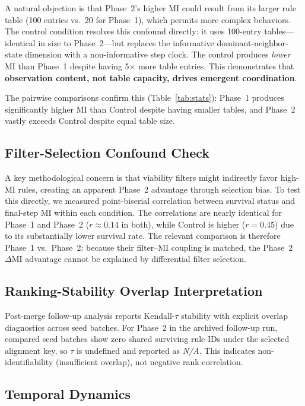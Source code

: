 \documentclass[letterpaper]{article}
\begin{document}
A natural objection is that Phase~2's higher MI could result from its larger
rule table (100 entries vs.\ 20 for Phase~1), which permits more complex
behaviors. The control condition resolves this confound directly: it uses
100-entry tables---identical in size to Phase~2---but replaces the informative
dominant-neighbor-state dimension with a non-informative step clock. The control
produces \emph{lower} MI than Phase~1 despite having 5$\times$ more table
entries. This demonstrates that \textbf{observation content, not table capacity,
drives emergent coordination}.

The pairwise comparisons confirm this (Table~\ref{tab:stats}): Phase~1
produces significantly higher MI than Control despite having smaller tables,
and Phase~2 vastly exceeds Control despite equal table size.

\subsection{Filter-Selection Confound Check}

A key methodological concern is that viability filters might indirectly favor
high-MI rules, creating an apparent Phase~2 advantage through selection bias.
To test this directly, we measured point-biserial correlation between survival
status and final-step MI within each condition. The correlations are nearly
identical for Phase~1 and Phase~2 ($r \approx 0.14$ in both), while Control is
higher ($r = 0.45$) due to its substantially lower survival rate.
The relevant comparison is therefore Phase~1 vs.\ Phase~2: because their
filter--MI coupling is matched, the Phase~2 $\Delta\mathrm{MI}$ advantage cannot be
explained by differential filter selection.

\subsection{Ranking-Stability Overlap Interpretation}

Post-merge follow-up analysis reports Kendall-$\tau$ stability with explicit
overlap diagnostics across seed batches. For Phase~2 in the archived
follow-up run, compared seed batches show zero shared surviving rule IDs under
the selected alignment key, so $\tau$ is undefined and reported as
\emph{N/A}. This indicates non-identifiability (insufficient overlap), not
negative rank correlation.

\subsection{Temporal Dynamics}
\end{document}
